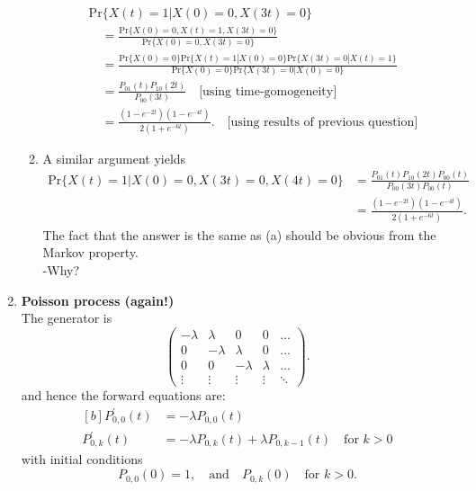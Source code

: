 \documentclass[11pt,a4paper]{article}
\begin{document}
\begin{enumerate}
\begin{enumerate}
      \begin{align*}
        &\text{Pr}\{X(t) = 1|X(0) = 0, X(3t) = 0\}\\
        &\quad = \frac{\text{Pr}\{X(0) = 0, X(t) = 1, X(3t) = 0\}}{\text{Pr}\{X(0) = 0, X(3t) = 0\}}\\
        &\quad = \frac{\text{Pr}\{X(0) = 0\}\text{Pr}\{X(t) = 1|X(0) = 0\}\text{Pr}\{X(3t) = 0|X(t) = 1\}}{\text{Pr}\{X(0) = 0\}\text{Pr}\{X(3t) = 0 |X(0) = 0\}}\\
        &\quad = \frac{P_{01}(t)P_{10}(2t)}{P_{00}(3t)}\quad \text{[using time-gomogeneity]}\\
        &\quad = \frac{(1 - e^{-2t})(1 - e^{-4t})}{2(1 + e^{-6t})}.\quad \text{[using results of previous question]}
      \end{align*}
      \item A similar argument yields
      \begin{align*}
        \text{Pr}\{X(t) = 1|X(0) = 0, X(3t) = 0, X(4t) = 0\} 
        &= \frac{P_{01}(t)P_{10}(2t)P_{00}(t)}{P_{00}(3t)P_{00}(t)}\\
        &= \frac{(1 - e^{-2t})(1 - e^{-4t})}{2(1 + e^{-6t})}.
      \end{align*}
      The fact that the answer is the same as (a) should be obvious from the Markov property.\\
      -Why?
    \end{enumerate}
    \item \textbf{Poisson process (again!)}\\
    The generator is
    $$
    \begin{pmatrix}
      -\lambda & \lambda& 0 & 0 & \ldots\\
      0 & -\lambda & \lambda & 0 & \ldots\\
      0 & 0 & -\lambda & \lambda & \ldots\\
      \vdots & \vdots & \vdots & \vdots & \ddots
    \end{pmatrix}.
    $$
    and hence the forward equations are:
    \begin{equation}\tag{8.1}
      \begin{aligned}[b]
        P^\prime_{0, 0}(t) &= -\lambda P_{0,0}(t)\\
        P^\prime_{0, k}(t) &= -\lambda P_{0, k}(t) + \lambda P_{0, k-1}(t)\quad \text{for $k > 0$}
      \end{aligned}
    \end{equation}
    with initial conditions
    $$
    P_{0,0}(0) = 1,\quad\text{and}\quad P_{0,k}(0)\quad\text{for $k > 0$}.
$$
\end{enumerate}
\end{document}
